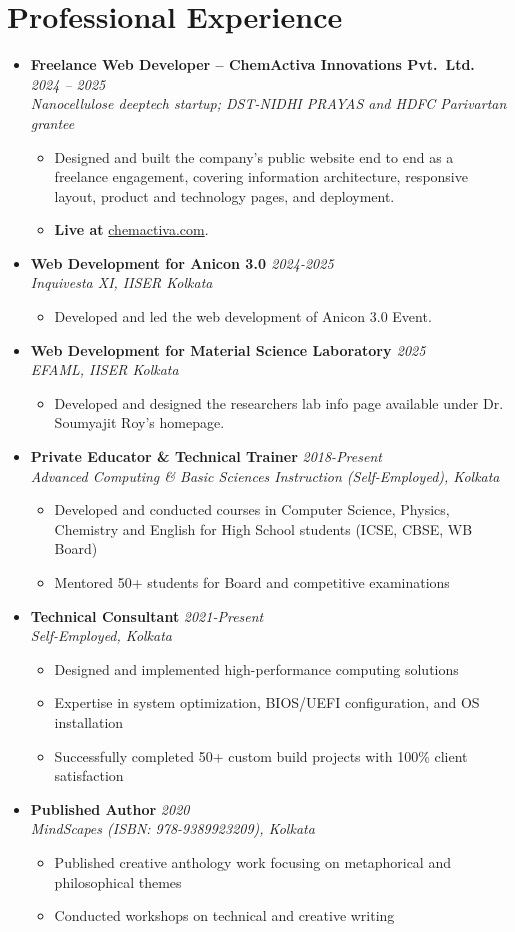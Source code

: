 \documentclass[a4paper,10pt]{article}
\newcommand{\resumeProject}[4]{
    \item\small{
        \textbf{#1} \hfill \textit{#2}\\
        \textit{#3}\\
        \begin{itemize}[leftmargin=1.5em,label=\textbullet,nosep,itemsep=0.5pt]
            #4
        \end{itemize}
    }\vspace{2pt}
}
\newcommand{\compactSection}[2]{
    \section{#1}
    \vspace{-0.1cm}
    #2
    \vspace{-0.2cm}
}
\begin{document}
\compactSection{Professional Experience}{
\begin{itemize}[leftmargin=*,label={},itemsep=4pt]

    \resumeProject{Freelance Web Developer -- ChemActiva Innovations Pvt.\ Ltd.\ \href{https://chemactiva.com/}{\faGlobe}}{2024 -- 2025}
    {Nanocellulose deeptech startup; DST-NIDHI PRAYAS and HDFC Parivartan grantee}
    {\item Designed and built the company's public website end to end as a freelance engagement, covering information architecture, responsive layout, product and technology pages, and deployment.
    \item \textbf{Live at} \href{https://chemactiva.com/}{chemactiva.com}.}

    \resumeProject{Web Development for Anicon 3.0 \href{https://anicon3.github.io/}{\faGlobe}}{2024-2025}
    {Inquivesta XI, IISER Kolkata}
    {\item Developed and led the web development of Anicon 3.0 Event. }

    \resumeProject{Web Development for Material Science Laboratory \href{https://shuvam-banerji-seal.github.io/EFAML_WEB/index.html}{\faGlobe}}{2025}
    {EFAML, IISER Kolkata}
    {\item Developed and designed the researchers lab info page available under Dr. Soumyajit Roy's homepage.}
     
    \resumeProject{Private Educator \& Technical Trainer}{2018-Present}
    {Advanced Computing \& Basic Sciences Instruction \textit{(Self-Employed)}, Kolkata}
    {\item Developed and conducted courses in Computer Science, Physics, Chemistry and English for High School students (ICSE, CBSE, WB Board)
    \item Mentored 50+ students for Board and competitive examinations}
     
    \resumeProject{Technical Consultant}{2021-Present}
    {Self-Employed, Kolkata}
    {\item Designed and implemented high-performance computing solutions
    \item Expertise in system optimization, BIOS/UEFI configuration, and OS installation
    \item Successfully completed 50+ custom build projects with 100\% client satisfaction}
     
    \resumeProject{Published Author}{2020}
    {MindScapes (ISBN: 978-9389923209), Kolkata}
    {\item Published creative anthology work focusing on metaphorical and philosophical themes
    \item Conducted workshops on technical and creative writing}
     
\end{itemize}
}
\end{document}
